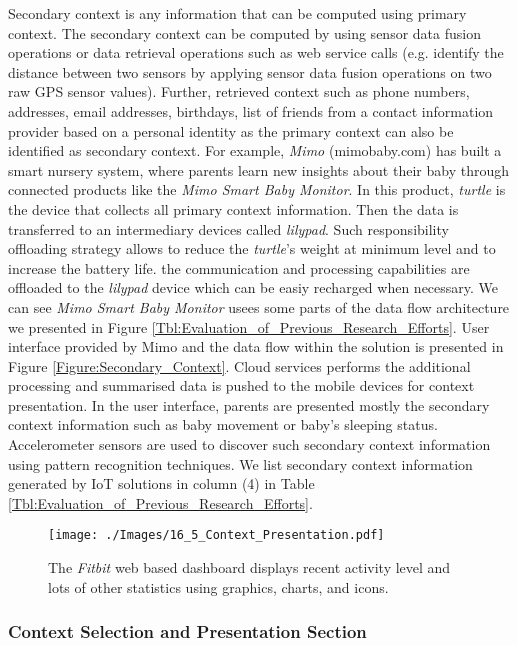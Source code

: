 \documentclass[journal]{IEEEtran}
\begin{document}
Secondary context is any information that can be computed using primary context. The secondary context can be computed by using sensor data fusion operations or data retrieval operations such as web service calls (e.g. identify the distance between two sensors by applying sensor data fusion operations on two raw GPS sensor values). Further, retrieved context such as phone numbers, addresses, email addresses, birthdays, list of friends from a contact  information provider based on a personal identity as the primary  context can also be identified  as secondary context.  For example, \textit{Mimo} (mimobaby.com) has built a smart nursery system, where parents learn new insights about their baby through connected products like the \textit{Mimo Smart Baby Monitor}. In this product, \textit{turtle} is the device that collects all primary context information. Then the data is transferred to an intermediary devices called \textit{lilypad}. Such responsibility offloading strategy allows to reduce the \textit{turtle}'s weight at minimum level and to increase the battery life. the communication and processing capabilities are offloaded to the \textit{lilypad} device which can be easiy recharged when necessary. We can see \textit{Mimo Smart Baby Monitor} usees some parts of the data flow architecture we presented in Figure \ref{Tbl:Evaluation_of_Previous_Research_Efforts}. User interface provided by Mimo and the data flow within the solution is presented in Figure \ref{Figure:Secondary_Context}. Cloud services \cite{IA02} performs the additional processing and summarised data is pushed to the mobile devices for context presentation. In the user interface, parents are presented mostly the secondary context information such as baby movement or baby's sleeping status. Accelerometer sensors are used to discover such secondary context information using pattern recognition techniques. We list secondary context information generated by IoT solutions in column (4) in Table \ref{Tbl:Evaluation_of_Previous_Research_Efforts}.
 
  \begin{figure}[!b]
   \centering
\texttt{[image: ./Images/16\_5\_Context\_Presentation.pdf]}
\caption{The \textit{Fitbit} web based dashboard displays recent activity level and lots of other statistics using graphics, charts, and icons.}
   \label{Figure:Context_Presentation}	
\end{figure}
 
\subsubsection{Context Selection and Presentation Section}
 
\end{document}
